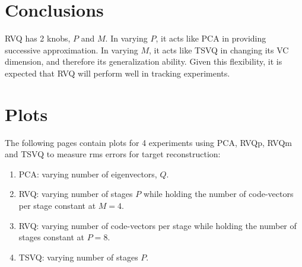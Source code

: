 %
%
\section{Conclusions}
RVQ has 2 knobs, $P$ and $M$. In varying $P$, it acts like PCA in providing successive approximation. In varying $M$, it acts like TSVQ in changing its VC dimension, and therefore its generalization ability.
Given this flexibility, it is expected that RVQ will perform well in tracking experiments.
\newpage
\appendix
\section{Plots}
\label{App:plots}
The following pages contain plots for 4 experiments using PCA, RVQp, RVQm and TSVQ to measure rms errors for target reconstruction:
\begin{enumerate}
\item PCA: varying number of eigenvectors, $Q$.
\item RVQ: varying number of stages $P$ while holding the number of code-vectors per stage constant at $M=4$.
\item RVQ: varying number of code-vectors per stage while holding the number of stages constant at $P=8$.
\item TSVQ: varying number of stages $P$.
\end{enumerate}
\newpage
